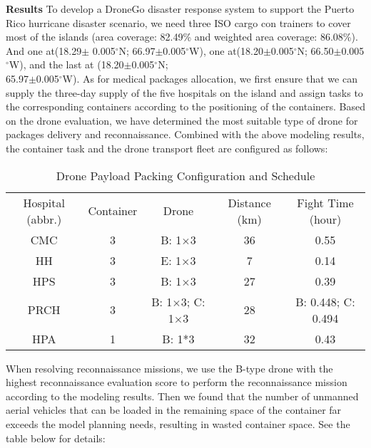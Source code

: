 \documentclass{mcmthesis}
\begin{document}
\textbf{Results}
To develop a DroneGo disaster response system to support the Puerto Rico hurricane disaster scenario, we need three ISO cargo con trainers to cover most of the islands (area coverage: 82.49\% and weighted area coverage: 86.08\%). And one at(18.29$\pm$ 0.005$^\circ$N; 66.97$\pm$0.005$^\circ$W), one at(18.20$\pm$0.005$^\circ$N; 66.50$\pm$0.005$^\circ$W), and the last at (18.20$\pm$0.005$^\circ$N;\\ 65.97$\pm$0.005$^\circ$W).
As for medical packages allocation, we first ensure that we can supply the three-day supply of the five hospitals on the island and assign tasks to the corresponding containers according to the positioning of the containers. Based on the drone evaluation, we have determined the most suitable type of drone for packages delivery and reconnaissance. Combined with the above modeling results, the container task and the drone transport fleet are configured as follows:
	\begin{table}[H]
	\centering
	
	\begin{tabular}{lllcc}
		\cline{1-5}
		
		\multicolumn{1}{c}{Hospital (abbr.)}  & \multicolumn{1}{c}{Container}         & \multicolumn{1}{c}{Drone} & \multicolumn{1}{c}{Distance (km)}     & \multicolumn{1}{c}{Fight Time (hour)} \\
		\cline{1-5}
		
		\multicolumn{1}{c}{CMC}  & \multicolumn{1}{c}{3}  &\multicolumn{1}{c}{B: 1$\times$3}    & 36 & 0.55   \\
		\multicolumn{1}{c}{HH}   & \multicolumn{1}{c}{3}  &\multicolumn{1}{c}{E: 1$\times$3}    & 7 &  0.14  \\
		\multicolumn{1}{c}{HPS}  & \multicolumn{1}{c}{3}  &\multicolumn{1}{c}{B: 1$\times$3}  & 27 & 0.39 \\ 
		\multicolumn{1}{c}{PRCH} & \multicolumn{1}{c}{3}  &\multicolumn{1}{c}{B: 1$\times$3;  C: 1$\times$3}  & 28 & B: 0.448; C: 0.494     \\
		\multicolumn{1}{c}{HPA}  & \multicolumn{1}{c}{1}  &\multicolumn{1}{c}{B: 1*3}   & 32  & 0.43  \\ 			
		\cline{1-5}
		
	\end{tabular}
	\caption{Drone Payload Packing Configuration and Schedule}

\end{table}

When resolving reconnaissance missions, we use the B-type drone with the highest reconnaissance evaluation score to perform the reconnaissance mission according to the modeling results. Then we found that the number of unmanned aerial vehicles that can be loaded in the remaining space of the container far exceeds the model planning needs, resulting in wasted container space. See the table below for details: 
\end{document}
